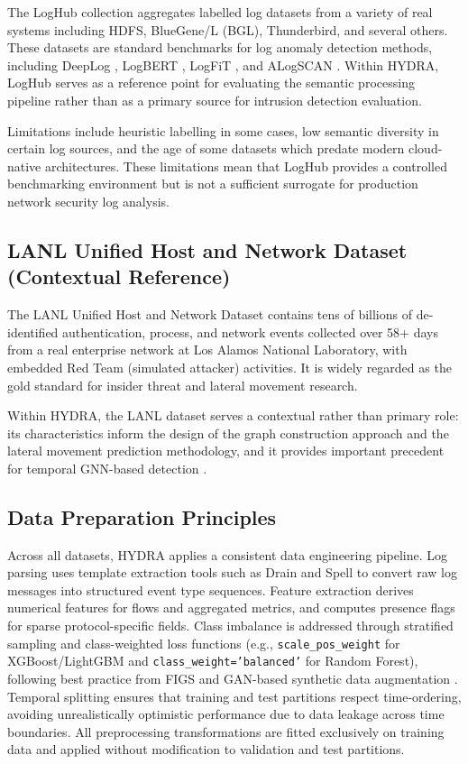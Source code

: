 \documentclass[12pt,a4paper]{report}
\begin{document}
The LogHub collection \citep{zhu2023} aggregates labelled log datasets from a variety of real systems including HDFS, BlueGene/L (BGL), Thunderbird, and several others. These datasets are standard benchmarks for log anomaly detection methods, including DeepLog \citep{du2017}, LogBERT \citep{guo2021}, LogFiT \citep{qi2023}, and ALogSCAN \citep{raeiszadeh2025}. Within HYDRA, LogHub serves as a reference point for evaluating the semantic processing pipeline rather than as a primary source for intrusion detection evaluation.

Limitations include heuristic labelling in some cases, low semantic diversity in certain log sources, and the age of some datasets which predate modern cloud-native architectures. These limitations mean that LogHub provides a controlled benchmarking environment but is not a sufficient surrogate for production network security log analysis.

\subsection{LANL Unified Host and Network Dataset (Contextual Reference)}
\label{sec:lanl}

The LANL Unified Host and Network Dataset \citep{turcotte2017} contains tens of billions of de-identified authentication, process, and network events collected over 58+ days from a real enterprise network at Los Alamos National Laboratory, with embedded Red Team (simulated attacker) activities. It is widely regarded as the gold standard for insider threat and lateral movement research.

Within HYDRA, the LANL dataset serves a contextual rather than primary role: its characteristics inform the design of the graph construction approach and the lateral movement prediction methodology, and it provides important precedent for temporal GNN-based detection \citep{king2023,lo2023}.

\subsection{Data Preparation Principles}
\label{sec:data-prep}

Across all datasets, HYDRA applies a consistent data engineering pipeline. Log parsing uses template extraction tools such as Drain and Spell to convert raw log messages into structured event type sequences. Feature extraction derives numerical features for flows and aggregated metrics, and computes presence flags for sparse protocol-specific fields. Class imbalance is addressed through stratified sampling and class-weighted loss functions (e.g., \texttt{scale\_pos\_weight} for XGBoost/LightGBM and \texttt{class\_weight='balanced'} for Random Forest), following best practice from FIGS \citep{anbiaee2025} and GAN-based synthetic data augmentation \citep{alabsi2023}. Temporal splitting ensures that training and test partitions respect time-ordering, avoiding unrealistically optimistic performance due to data leakage across time boundaries. All preprocessing transformations are fitted exclusively on training data and applied without modification to validation and test partitions.
\end{document}
